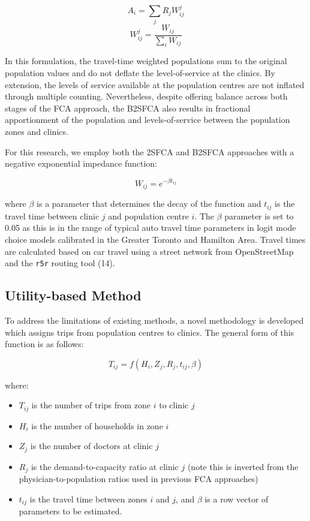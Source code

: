 \documentclass{article}
\begin{document}
\[
A_i = \sum_j{R_jW_{ij}^{j}}
\] \[
W_{ij}^{j} = \frac{W_{ij}}{\sum_i W_{ij}}
\]

In this formulation, the travel-time weighted populations sum to the
original population values and do not deflate the level-of-service at
the clinics. By extension, the levels of service available at the
population centres are not inflated through multiple counting.
Nevertheless, despite offering balance across both stages of the FCA
approach, the B2SFCA also results in fractional apportionment of the
population and levels-of-service between the population zones and
clinics.

For this research, we employ both the 2SFCA and B2SFCA approaches with a
negative exponential impedance function:

\[
W_{ij} = e^{-\beta t_{ij}}
\]

where \(\beta\) is a parameter that determines the decay of the function
and \(t_{ij}\) is the travel time between clinic \(j\) and population
centre \(i\). The \(\beta\) parameter is set to 0.05 as this is in the
range of typical auto travel time parameters in logit mode choice models
calibrated in the Greater Toronto and Hamilton Area. Travel times are
calculated based on car travel using a street network from OpenStreetMap
and the \texttt{r5r} routing tool (14).

\hypertarget{utility-based-method}{%
\subsection{Utility-based Method}\label{utility-based-method}}

To address the limitations of existing methods, a novel methodology is
developed which assigns trips from population centres to clinics. The
general form of this function is as follows:

\[
T_{ij} = f(H_i, Z_j, R_j, t_{ij}, \beta)
\]

where:

\begin{itemize}
\tightlist
\item
  \(T_{ij}\) is the number of trips from zone \(i\) to clinic \(j\)
\item
  \(H_i\) is the number of households in zone \(i\)
\item
  \(Z_j\) is the number of doctors at clinic \(j\)
\item
  \(R_j\) is the demand-to-capacity ratio at clinic \(j\) (note this is
  inverted from the physician-to-population ratios used in previous FCA
  approaches)
\item
  \(t_{ij}\) is the travel time between zones \(i\) and \(j\), and
  \(\beta\) is a row vector of parameters to be estimated.
\end{itemize}
\end{document}
